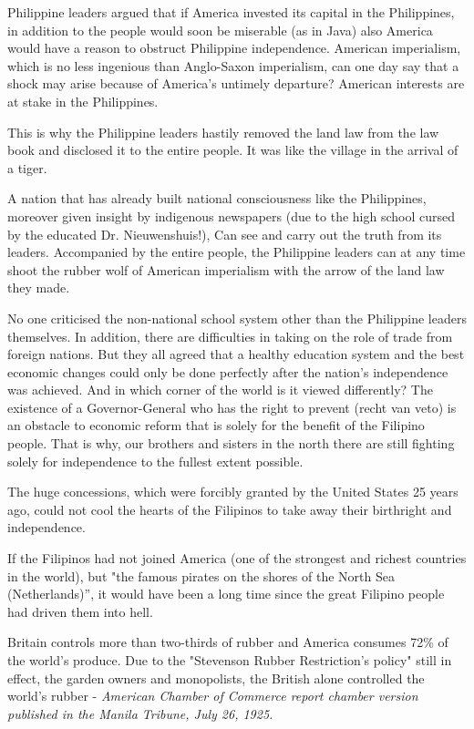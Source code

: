Philippine leaders argued that if America invested its capital in the Philippines, in addition 
to the people would soon be miserable (as in Java) also America would have a reason to obstruct 
Philippine independence. American imperialism, which is no less ingenious than Anglo-Saxon imperialism, 
can one day say that a shock may arise because of America's untimely departure? American interests are at stake in the Philippines.\nline

This is why the Philippine leaders hastily removed the land law from the law book and disclosed it 
to the entire people. It was like the village in the arrival of a tiger.\nline

A nation that has already built national consciousness like the Philippines, moreover given 
insight by indigenous newspapers (due to the high school cursed by the educated Dr. Nieuwenshuis!), 
Can see and carry out the truth from its leaders. Accompanied by the entire people, the Philippine 
leaders can at any time shoot the rubber wolf of American imperialism with the arrow of the land law they made.\nline

No one criticised the non-national school system other than the Philippine leaders themselves. 
In addition, there are difficulties in taking on the role of trade from foreign nations. But they 
all agreed that a healthy education system and the best economic changes could only be done 
perfectly after the nation's independence was achieved. And in which corner of the world is it 
viewed differently? The existence of a Governor-General who has the right to prevent (recht van veto) 
is an obstacle to economic reform that is solely for the benefit of the Filipino people. That is why, 
our brothers and sisters in the north there are still fighting solely for independence to the fullest extent possible.\nline

The huge concessions, which were forcibly granted by the United States 25 years ago, 
could not cool the hearts of the Filipinos to take away their birthright and independence.\nline

If the Filipinos had not joined America (one of the strongest and richest countries in the world), 
but "the famous pirates on the shores of the North Sea (Netherlands)”, it would have been a long time 
since the great Filipino people had driven them into hell.\nline

Britain controls more than two-thirds of rubber and America consumes 72\% of the world's produce. 
Due to the "Stevenson Rubber Restriction's policy" still in effect, the garden owners and monopolists, 
the British alone controlled the world's rubber - \emph{American Chamber of Commerce report chamber version 
published in the Manila Tribune, July 26, 1925.}\nline

